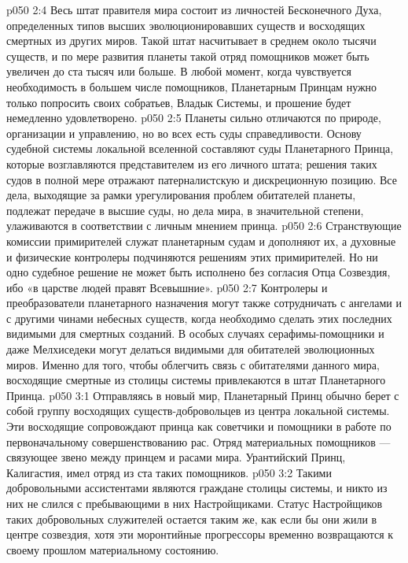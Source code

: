 \vs p050 2:4 Весь штат правителя мира состоит из личностей Бесконечного Духа, определенных типов высших эволюционировавших существ и восходящих смертных из других миров. Такой штат насчитывает в среднем около тысячи существ, и по мере развития планеты такой отряд помощников может быть увеличен до ста тысяч или больше. В любой момент, когда чувствуется необходимость в большем числе помощников, Планетарным Принцам нужно только попросить своих собратьев, Владык Системы, и прошение будет немедленно удовлетворено.
\vs p050 2:5 Планеты сильно отличаются по природе, организации и управлению, но во всех есть суды справедливости. Основу судебной системы локальной вселенной составляют суды Планетарного Принца, которые возглавляются представителем из его личного штата; решения таких судов в полной мере отражают патерналистскую и дискреционную позицию. Все дела, выходящие за рамки урегулирования проблем обитателей планеты, подлежат передаче в высшие суды, но дела мира, в значительной степени, улаживаются в соответствии с личным мнением принца.
\vs p050 2:6 Странствующие комиссии примирителей служат планетарным судам и дополняют их, а духовные и физические контролеры подчиняются решениям этих примирителей. Но ни одно судебное решение не может быть исполнено без согласия Отца Созвездия, ибо «в царстве людей правят Всевышние».
\vs p050 2:7 Контролеры и преобразователи планетарного назначения могут также сотрудничать с ангелами и с другими чинами небесных существ, когда необходимо сделать этих последних видимыми для смертных созданий. В особых случаях серафимы\hyp{}помощники и даже Мелхиседеки могут делаться видимыми для обитателей эволюционных миров. Именно для того, чтобы облегчить связь с обитателями данного мира, восходящие смертные из столицы системы привлекаются в штат Планетарного Принца.
\vs p050 3:1 Отправляясь в новый мир, Планетарный Принц обычно берет с собой группу восходящих существ\hyp{}добровольцев из центра локальной системы. Эти восходящие сопровождают принца как советчики и помощники в работе по первоначальному совершенствованию рас. Отряд материальных помощников --- связующее звено между принцем и расами мира. Урантийский Принц, Калигастия, имел отряд из ста таких помощников.
\vs p050 3:2 \pc Такими добровольными ассистентами являются граждане столицы системы, и никто из них не слился с пребывающими в них Настройщиками. Статус Настройщиков таких добровольных служителей остается таким же, как если бы они жили в центре созвездия, хотя эти моронтийные прогрессоры временно возвращаются к своему прошлом материальному состоянию.
